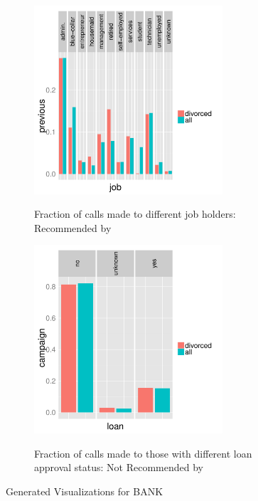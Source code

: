 \begin{figure}[h] 
\centering
\begin{subfigure}{\linewidth}
\centering
{\includegraphics[width=7cm] {Images/seedb_dim_job_measure_previous.pdf}}
\caption{Fraction of calls made to different job holders: Recommended by \SeeDB}
\label{fig:job}
\end{subfigure}
\begin{subfigure}{\linewidth}
\centering
{\includegraphics[width=7cm] {Images/seedb_dim_loan_measure_campaign.pdf}}
\caption{Fraction of calls made to those with different loan approval status: Not Recommended by \SeeDB}
\label{fig:loan}
\end{subfigure}
\vspace{-10pt}
\caption{\SeeDB Generated Visualizations for BANK}\label{fig:qual-study2}

\vspace{-10pt}
\end{figure}